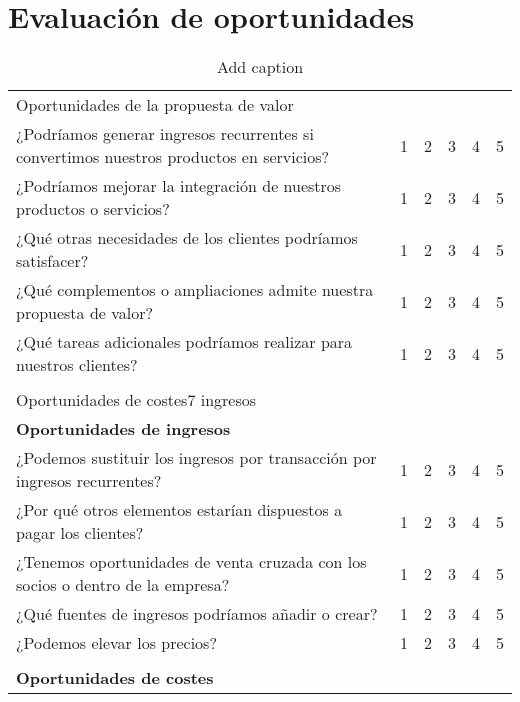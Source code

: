 \documentclass[11pt]{book}
\begin{document}
\section{Evaluación de oportunidades}
\begin{table}[htbp]
  \centering
  \caption{Add caption}
    \begin{tabular}{p{27.93em}rrrrr}
    \textcolor[rgb]{ 1,  0,  0}{Oportunidades de la propuesta de valor} &       &       &       &       &  \\
    ¿Podríamos generar ingresos recurrentes si convertimos nuestros productos en servicios? & 1     & 2     & 3     & 4     & 5 \\
    ¿Podríamos mejorar la integración de nuestros productos o servicios? & 1     & 2     & 3     & 4     & 5 \\
    ¿Qué otras necesidades de los clientes podríamos satisfacer? & 1     & 2     & 3     & 4     & 5 \\
    ¿Qué complementos o ampliaciones admite nuestra propuesta de valor? & 1     & 2     & 3     & 4     & 5 \\
    ¿Qué tareas adicionales podríamos realizar para nuestros clientes? & 1     & 2     & 3     & 4     & 5 \\
    \multicolumn{1}{l}{} &       &       &       &       &  \\
    \textcolor[rgb]{ 1,  0,  0}{Oportunidades de costes7 ingresos} &       &       &       &       &  \\
    \textbf{Oportunidades de ingresos} &       &       &       &       &  \\
    ¿Podemos sustituir los ingresos por transacción por ingresos recurrentes? & 1     & 2     & 3     & 4     & 5 \\
    ¿Por qué otros elementos estarían dispuestos a pagar los clientes? & 1     & 2     & 3     & 4     & 5 \\
    ¿Tenemos oportunidades de venta cruzada con los socios o dentro de la empresa? & 1     & 2     & 3     & 4     & 5 \\
    ¿Qué fuentes de ingresos podríamos añadir o crear? & 1     & 2     & 3     & 4     & 5 \\
    ¿Podemos elevar los precios? & 1     & 2     & 3     & 4     & 5 \\
    \multicolumn{1}{l}{} &       &       &       &       &  \\
    \textbf{Oportunidades de costes} &       &       &       &       &  \\

\end{tabular}
\end{table}
\end{document}
